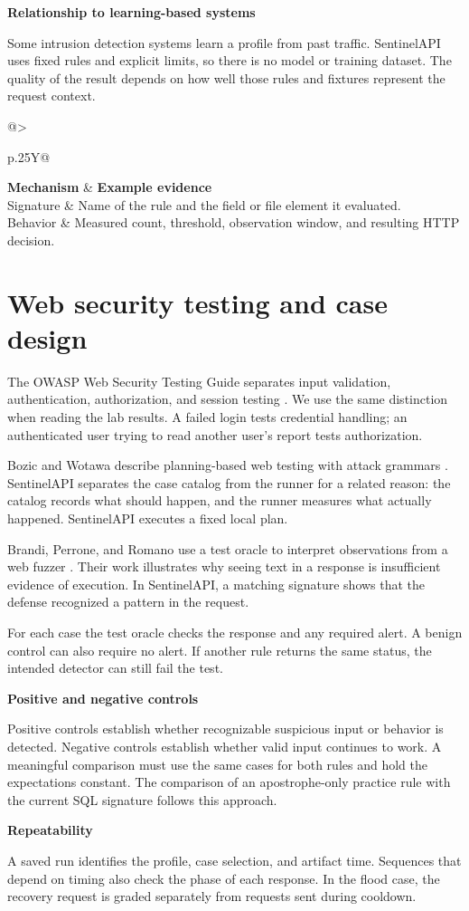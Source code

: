 \documentclass[11pt,a4paper,oneside]{report}
\makeatletter
\newcommand{\topic}[1]{\par\addvspace{4pt}\noindent\textbf{#1}\par\nobreak\vspace{-.20em}}
\newcommand{\sheet}[1]{\clearpage\section{#1}}
\newcommand{\tabletitle}[1]{\par\addvspace{6pt}\noindent\parbox{\linewidth}{\captionof{table}{#1}}\par\nobreak}
\newcommand{\bodytable}[1]{\begin{tabularx}{\linewidth}{@{}>{\raggedright\arraybackslash}p{.25\linewidth}Y@{}}\toprule #1\bottomrule\end{tabularx}}
\makeatother
\begin{document}
\topic{Relationship to learning-based systems}
Some intrusion detection systems learn a profile from past traffic. SentinelAPI uses fixed rules and explicit limits, so there is no model or training dataset. The quality of the result depends on how well those rules and fixtures represent the request context.

\tabletitle{Two sources of detection evidence}
\bodytable{\textbf{Mechanism} & \textbf{Example evidence}\\\midrule
Signature & Name of the rule and the field or file element it evaluated.\\
Behavior & Measured count, threshold, observation window, and resulting HTTP decision.\\}

\sheet{Web security testing and case design}
The OWASP Web Security Testing Guide separates input validation, authentication, authorization, and session testing \cite{owasp}. We use the same distinction when reading the lab results. A failed login tests credential handling; an authenticated user trying to read another user's report tests authorization.

Bozic and Wotawa describe planning-based web testing with attack grammars \cite{bozic}. SentinelAPI separates the case catalog from the runner for a related reason: the catalog records what should happen, and the runner measures what actually happened. SentinelAPI executes a fixed local plan.

Brandi, Perrone, and Romano use a test oracle to interpret observations from a web fuzzer \cite{brandi}. Their work illustrates why seeing text in a response is insufficient evidence of execution. In SentinelAPI, a matching signature shows that the defense recognized a pattern in the request.

For each case the test oracle checks the response and any required alert. A benign control can also require no alert. If another rule returns the same status, the intended detector can still fail the test.

\topic{Positive and negative controls}
Positive controls establish whether recognizable suspicious input or behavior is detected. Negative controls establish whether valid input continues to work. A meaningful comparison must use the same cases for both rules and hold the expectations constant. The comparison of an apostrophe-only practice rule with the current SQL signature follows this approach.

\topic{Repeatability}
A saved run identifies the profile, case selection, and artifact time. Sequences that depend on timing also check the phase of each response. In the flood case, the recovery request is graded separately from requests sent during cooldown.
\end{document}
